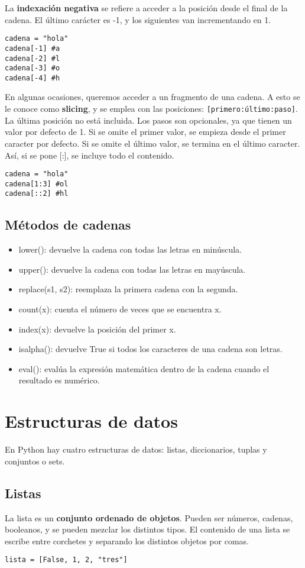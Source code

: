 La \textbf{indexación negativa} se refiere a acceder a la posición desde el final de la cadena. El último carácter es -1, y los siguientes van incrementando en 1. 
\begin{lstlisting}
cadena = "hola"
cadena[-1] #a
cadena[-2] #l
cadena[-3] #o
cadena[-4] #h
\end{lstlisting}

En algunas ocasiones, queremos acceder a un fragmento de una cadena. A esto se le conoce como \textbf{slicing}, y se emplea con las posiciones: \texttt{[primero:último:paso]}. La última posición no está incluida. Los pasos son opcionales, ya que tienen un valor por defecto de 1. Si se omite el primer valor, se empieza desde el primer caracter por defecto. Si se omite el último valor, se termina en el último caracter. Así, si se pone [:], se incluye todo el contenido.
\begin{lstlisting}
cadena = "hola"
cadena[1:3] #ol
cadena[::2] #hl
\end{lstlisting}

\subsection{Métodos de cadenas}
\begin{itemize}
\item lower(): devuelve la cadena con todas las letras en minúscula.
\item upper(): devuelve la cadena con todas las letras en mayúscula.
\item replace(s1, s2): reemplaza la primera cadena con la segunda.
\item count(x): cuenta el número de veces que se encuentra x.
\item index(x): devuelve la posición del primer x.
\item isalpha(): devuelve True si todos los caracteres de una cadena son letras.
\item eval(): evalúa la expresión matemática dentro de la cadena cuando el resultado es numérico.
\end{itemize}

\section{Estructuras de datos}
En Python hay cuatro estructuras de datos: listas, diccionarios, tuplas y conjuntos o sets. 

\subsection{Listas}
La lista es un \textbf{conjunto ordenado de objetos}. Pueden ser números, cadenas, booleanos, y se pueden mezclar los distintos tipos. El contenido de una lista se escribe entre corchetes y separando los distintos objetos por comas. 
\begin{lstlisting}
lista = [False, 1, 2, "tres"]
\end{lstlisting}

